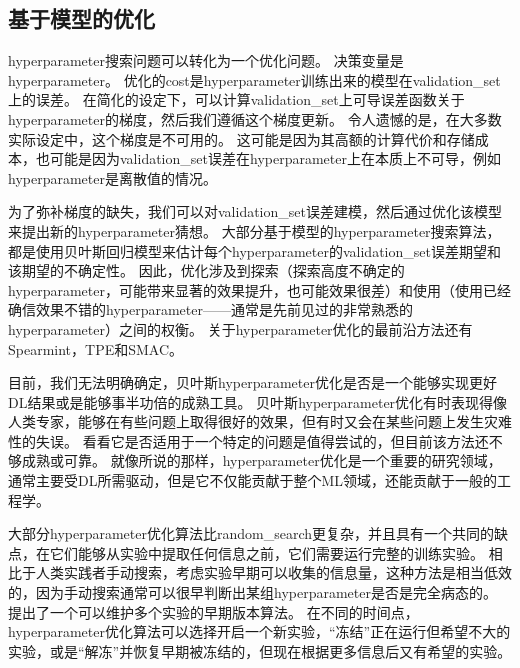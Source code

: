 
\subsection{基于模型的优化}
\label{sec:model_based_hyperparameter_optimization}
\gls{hyperparameter}搜索问题可以转化为一个优化问题。
决策变量是\gls{hyperparameter}。
优化的\gls{cost}是\gls{hyperparameter}训练出来的模型在\gls{validation_set}上的误差。
在简化的设定下，可以计算\gls{validation_set}上可导误差函数关于\gls{hyperparameter}的梯度，然后我们遵循这个梯度更新\citep{bengio:1999:snowbird,bengio-hyper-NC00,maclaurin2015gradient}。
令人遗憾的是，在大多数实际设定中，这个梯度是不可用的。
这可能是因为其高额的计算代价和存储成本，也可能是因为\gls{validation_set}误差在\gls{hyperparameter}上在本质上不可导，例如\gls{hyperparameter}是离散值的情况。


为了弥补梯度的缺失，我们可以对\gls{validation_set}误差建模，然后通过优化该模型来提出新的\gls{hyperparameter}猜想。
大部分基于模型的\gls{hyperparameter}搜索算法，都是使用贝叶斯回归模型来估计每个\gls{hyperparameter}的\gls{validation_set}误差期望和该期望的不确定性。
因此，优化涉及到探索（探索高度不确定的\gls{hyperparameter}，可能带来显著的效果提升，也可能效果很差）和使用（使用已经确信效果不错的\gls{hyperparameter}——通常是先前见过的非常熟悉的\gls{hyperparameter}）之间的权衡。%
关于\gls{hyperparameter}优化的最前沿方法还有Spearmint\citep{Snoek+al-NIPS2012-small}，TPE\citep{Bergstra+al-NIPS2011}和SMAC\citep{hutter+hoos+leyton+brown:2011}。


目前，我们无法明确确定，贝叶斯\gls{hyperparameter}优化是否是一个能够实现更好\gls{DL}结果或是能够事半功倍的成熟工具。
贝叶斯\gls{hyperparameter}优化有时表现得像人类专家，能够在有些问题上取得很好的效果，但有时又会在某些问题上发生灾难性的失误。
看看它是否适用于一个特定的问题是值得尝试的，但目前该方法还不够成熟或可靠。
就像所说的那样，\gls{hyperparameter}优化是一个重要的研究领域，通常主要受\gls{DL}所需驱动，但是它不仅能贡献于整个\gls{ML}领域，还能贡献于一般的工程学。


大部分\gls{hyperparameter}优化算法比\gls{random_search}更复杂，并且具有一个共同的缺点，在它们能够从实验中提取任何信息之前，它们需要运行完整的训练实验。
相比于人类实践者手动搜索，考虑实验早期可以收集的信息量，这种方法是相当低效的，因为手动搜索通常可以很早判断出某组\gls{hyperparameter}是否是完全病态的。
\cite{swersky2014freeze}提出了一个可以维护多个实验的早期版本算法。
在不同的时间点，\gls{hyperparameter}优化算法可以选择开启一个新实验，``冻结''正在运行但希望不大的实验，或是``解冻''并恢复早期被冻结的，但现在根据更多信息后又有希望的实验。


